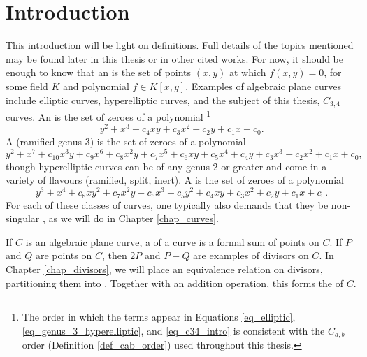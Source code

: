 

\section{Introduction}

This introduction will be light on definitions.
Full details of the topics mentioned may be found later in this thesis or in other cited works.
For now, it should be enough to know that an  is the set of points $(x,y)$
at which $f(x, y) = 0$, for some field $K$ and polynomial $f \in K[x,y]$.
Examples of algebraic plane curves include elliptic curves, hyperelliptic curves,
and the subject of this thesis, $C_{3,4}$ curves.
An  is the set of zeroes of a polynomial
\footnote{The order in which the terms appear in Equations
\ref{eq_elliptic}, \ref{eq_genus_3_hyperelliptic}, and \ref{eq_c34_intro}
is consistent with the $C_{a,b}$ order (Definition \ref{def_cab_order}) used throughout this thesis.}
\begin{equation}
  \label{eq_elliptic}
  y^2 + x^3 + c_4xy + c_3x^2 + c_2y + c_1x + c_0.
\end{equation}
A (ramified genus 3)  is the set of zeroes of a polynomial
\begin{equation}
  \label{eq_genus_3_hyperelliptic}
  y^2 + x^7 + c_{10}x^3y + c_9x^6 + c_8x^2y + c_7x^5 + c_6xy + c_5x^4 + c_4y + c_3x^3 + c_2x^2 + c_1x + c_0,
\end{equation}
though hyperelliptic curves can be of any genus 2 or greater and come in a variety of flavours (ramified, split, inert).
A  is the set of zeroes of a polynomial
\begin{equation}
  \label{eq_c34_intro}
  y^3 + x^4 + c_8xy^2 + c_7x^2y + c_6x^3 + c_5y^2 + c_4xy + c_3x^2 + c_2y + c_1x + c_0.
\end{equation}
For each of these classes of curves, one typically also demands that they be non-singular
,
as we will do in Chapter \ref{chap_curves}.

If $C$ is an algebraic plane curve, a  of a curve is a formal sum of points on $C$.
If $P$ and $Q$ are points on $C$, then $2P$ and $P - Q$ are examples of divisors on $C$.
In Chapter \ref{chap_divisors}, we will place an equivalence relation on divisors,
partitioning them into .
Together with an addition operation, this forms the  of $C$.



